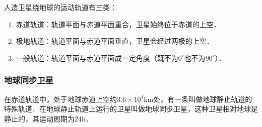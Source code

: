 人造卫星绕地球的运动轨道有三类：

\begin{enumerate}
\item 赤道轨道：轨道平面与赤道平面重合，卫星始终位于赤道的上空．
\item 极地轨道：轨道平面与赤道平面垂直，卫星会经过两极的上空．
\item 一般轨道：轨道平面与赤道平面成一定角度（既不为$0^\circ$也不为$90^\circ$）．
\end{enumerate}

\subsubsection{地球同步卫星}

在赤道轨道中，处于地球赤道上空约$3.6\times10^4\mathrm{km}$处，有一条叫做地球静止轨道的特殊轨道．在地球静止轨道上运行的卫星叫做地球同步卫星，这种卫星相对地球是静止的，其运动周期为$24\mathrm{h}$．
